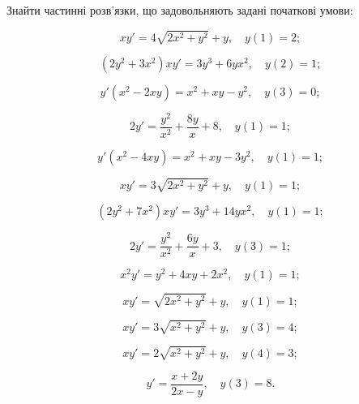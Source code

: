 Знайти частинні розв'язки, що задовольняють задані початкові умови:
\begin{problem}
	\[ x y' = 4 \sqrt{2 x^2 + y^2} + y, \quad y(1) = 2; \]
\end{problem}

\begin{problem}
	\[ (2 y^2 + 3 x^2) x y' = 3 y^3 + 6 y x^2, \quad y(2) = 1; \]
\end{problem}

\begin{problem}
	\[ y' (x^2 - 2 x y) = x^2 + x y - y^2, \quad y(3) = 0; \]
\end{problem}

\begin{problem}
	\[ 2 y' = \frac{y^2}{x^2} + \frac{8y}{x} + 8, \quad y(1) = 1; \]
\end{problem}

\begin{problem}
	\[ y' (x^2 - 4 x y) = x^2 + x y - 3 y^2, \quad y(1) = 1; \]
\end{problem}

\begin{problem}
	\[ x y' = 3 \sqrt{2 x^2 + y^2} + y, \quad y(1) = 1; \]
\end{problem}

\begin{problem}
	\[ (2 y^2 + 7 x^2) x y' = 3 y^3 + 14 y x^2, \quad y(1) = 1; \]
\end{problem}

\begin{problem}
	\[ 2 y' = \frac{y^2}{x^2} + \frac{6y}{x} + 3, \quad y(3) = 1; \]
\end{problem}

\begin{problem}
	\[ x^2 y' = y^2 + 4 x y + 2 x^2, \quad y(1) = 1; \]
\end{problem}

\begin{problem}
	\[ x y' = \sqrt{2 x^2 + y^2} + y, \quad y(1) = 1; \]
\end{problem}

\begin{problem}
	\[ x y' = 3 \sqrt{x^2 + y^2} + y, \quad y(3) = 4; \]
\end{problem}

\begin{problem}
	\[ x y' = 2 \sqrt{x^2 + y^2} + y, \quad y(4) = 3; \]
\end{problem}

\begin{problem}
	\[ y' = \frac{x + 2 y}{2 x - y}, \quad y(3) = 8. \]
\end{problem}